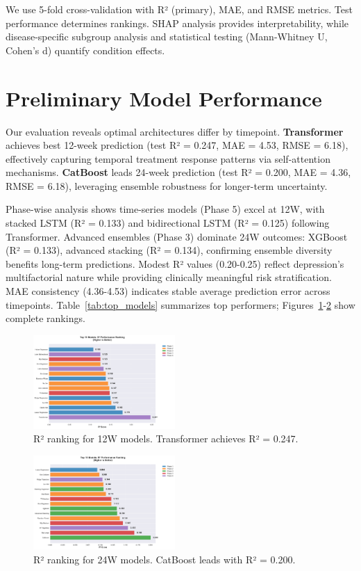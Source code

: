 \documentclass[conference]{IEEEtran}
\begin{document}
We use 5-fold cross-validation with R² (primary), MAE, and RMSE metrics. Test performance determines rankings. SHAP analysis provides interpretability, while disease-specific subgroup analysis and statistical testing (Mann-Whitney U, Cohen's d) quantify condition effects.

\section{Preliminary Model Performance}

Our evaluation reveals optimal architectures differ by timepoint. \textbf{Transformer} achieves best 12-week prediction (test R² = 0.247, MAE = 4.53, RMSE = 6.18), effectively capturing temporal treatment response patterns via self-attention mechanisms. \textbf{CatBoost} leads 24-week prediction (test R² = 0.200, MAE = 4.36, RMSE = 6.18), leveraging ensemble robustness for longer-term uncertainty.

Phase-wise analysis shows time-series models (Phase 5) excel at 12W, with stacked LSTM (R² = 0.133) and bidirectional LSTM (R² = 0.125) following Transformer. Advanced ensembles (Phase 3) dominate 24W outcomes: XGBoost (R² = 0.133), advanced stacking (R² = 0.134), confirming ensemble diversity benefits long-term predictions. Modest R² values (0.20-0.25) reflect depression's multifactorial nature while providing clinically meaningful risk stratification. MAE consistency (4.36-4.53) indicates stable average prediction error across timepoints. Table~\ref{tab:top_models} summarizes top performers; Figures~\ref{fig:12w_performance}-\ref{fig:24w_performance} show complete rankings.

\begin{figure}[t]
\centering
\includegraphics[width=0.48\textwidth]{../Results_12W/Figures/01_R2_Performance_Ranking.png}
\caption{R² ranking for 12W models. Transformer achieves R² = 0.247.}
\label{fig:12w_performance}
\end{figure}

\begin{figure}[t]
\centering
\includegraphics[width=0.48\textwidth]{../Results_24W/Figures/01_R2_Performance_Ranking.png}
\caption{R² ranking for 24W models. CatBoost leads with R² = 0.200.}
\label{fig:24w_performance}
\end{figure}
\end{document}
